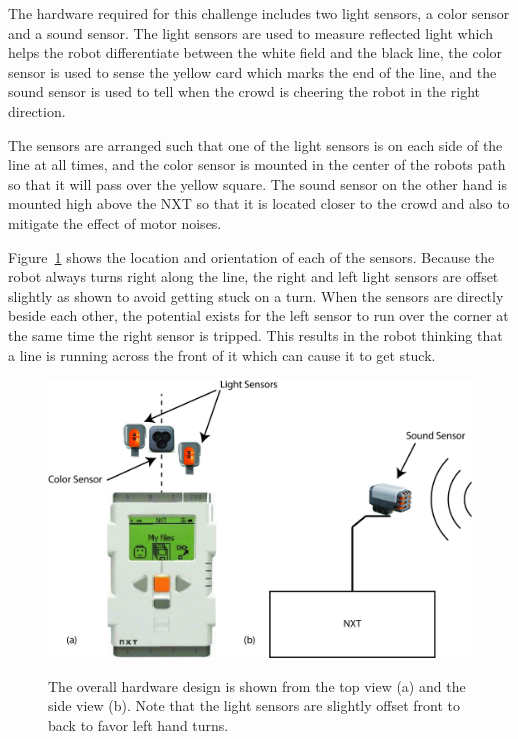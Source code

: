 \documentclass[journal]{IEEEtran}
\begin{document}
The hardware required for this challenge includes two light sensors, a color sensor and a sound sensor. The light sensors are used to measure reflected light which helps the robot differentiate between the white field and the black line, the color sensor is used to sense the yellow card which marks the end of the line, and the sound sensor is used to tell when the crowd is cheering the robot in the right direction. 

The sensors are arranged such that one of the light sensors is on each side of the line at all times, and the color sensor is mounted in the center of the robots path so that it will pass over the yellow square. The sound sensor on the other hand is mounted high above the NXT so that it is located closer to the crowd and also to mitigate the effect of motor noises.

Figure~\ref{F.hardware} shows the location and orientation of each of the sensors. Because the robot always turns right along the line, the right and left light sensors are offset slightly as shown to avoid getting stuck on a turn. When the sensors are directly beside each other, the potential exists for the left sensor to run over the corner at the same time the right sensor is tripped. This results in the robot thinking that a line is running across the front of it which can cause it to get stuck.

\begin{figure}[ht]
 \centering
  \includegraphics[width=1\columnwidth]{hardware.jpg}\\
  \caption{The overall hardware design is shown from the top view (a) and the side view (b). Note that the light sensors are slightly offset front to back to favor left hand turns.}
  \label{F.hardware}
\end{figure}
\end{document}
